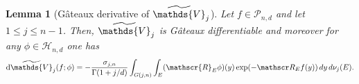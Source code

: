 \documentclass[11pt]{article}
\newtheorem{lemma}[theorem]{Lemma}
\theoremstyle{definition}
\numberwithin{equation}{section}
\newcommand{\cH}{\mathcal{H}}        %
\newcommand{\cP}{\mathcal{P}}        %
\newcommand{\opV}{\mathds{V}}       %
\begin{document}
\begin{lemma}[G\^ateaux derivative of $\widetilde\opV_j$]\label{lem.Vtil-gateaux}
    Let $f \in \cP_{n, d}$ and let $1 \leq j \leq n - 1$.
    Then, $\widetilde\opV_j$ is G\^ateaux differentiable and moreover for any $\phi \in \cH_{n, d}$ one has
    \begin{align*}
       \mathrm d \widetilde\opV_j(f; \phi) = - \dfrac{\sigma_{j, n}}{\Gamma(1 + j/d)} \int_{G(j, n)}\int_E (\mathscr{R}_E \phi)(y) \exp(- \mathscr R_E f(y)) \, dy \, d\nu_j(E).
    \end{align*}
\end{lemma}
\end{document}
